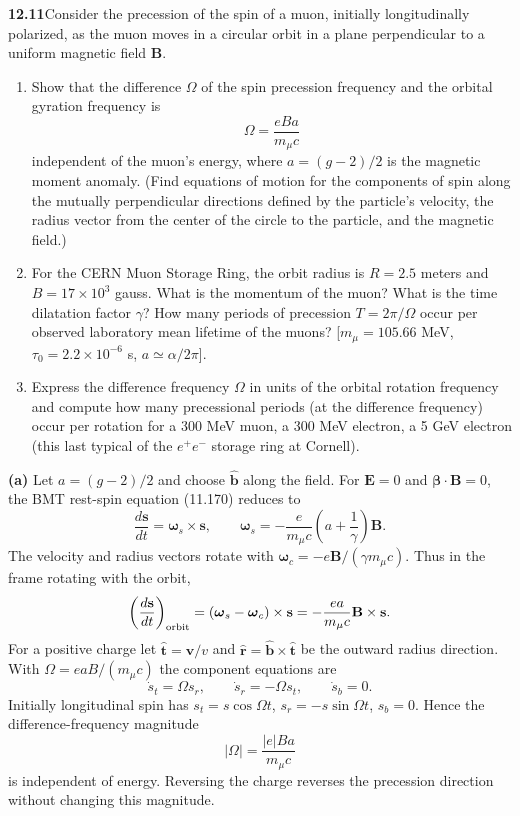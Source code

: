 \par\bigskip
\noindent\textbf{12.11}\quad Consider the precession of the spin of a muon, initially longitudinally polarized, as the muon moves in a circular orbit in a plane perpendicular to a uniform magnetic field $\mathbf{B}$.
\begin{enumerate}
\item[(a)] Show that the difference $\Omega$ of the spin precession frequency and the orbital gyration frequency is
\[
\Omega=\frac{eBa}{m_{\mu}c}
\]
independent of the muon's energy, where $a=(g-2)/2$ is the magnetic moment anomaly. (Find equations of motion for the components of spin along the mutually perpendicular directions defined by the particle's velocity, the radius vector from the center of the circle to the particle, and the magnetic field.)
\item[(b)] For the CERN Muon Storage Ring, the orbit radius is $R=2.5$ meters and $B=17\times10^{3}$ gauss. What is the momentum of the muon? What is the time dilatation factor $\gamma$? How many periods of precession $T=2\pi/\Omega$ occur per observed laboratory mean lifetime of the muons? [$m_{\mu}=105.66$ MeV, $\tau_{0}=2.2\times10^{-6}$ s, $a\simeq\alpha/2\pi$].
\item[(c)] Express the difference frequency $\Omega$ in units of the orbital rotation frequency and compute how many precessional periods (at the difference frequency) occur per rotation for a 300 MeV muon, a 300 MeV electron, a 5 GeV electron (this last typical of the $e^{+}e^{-}$ storage ring at Cornell).
\end{enumerate}
\solution

\medskip\noindent\textbf{(a)} Let $a=(g-2)/2$ and choose $\widehat{\mathbf b}$ along the field.
For $\mathbf E=0$ and $\boldsymbol\beta\cdot\mathbf B=0$, the BMT
rest-spin equation (11.170) reduces to
\[
\frac{d\mathbf s}{dt}=\boldsymbol\omega_s\times\mathbf s,
\qquad
\boldsymbol\omega_s=-\frac e{m_\mu c}
 \left(a+\frac1\gamma\right)\mathbf B.
\]
The velocity and radius vectors rotate with
$\boldsymbol\omega_c=-e\mathbf B/(\gamma m_\mu c)$.
Thus in the frame rotating with the orbit,
\[
\left(\frac{d\mathbf s}{dt}\right)_{\rm orbit}
=(\boldsymbol\omega_s-\boldsymbol\omega_c)\times\mathbf s
=-\frac{ea}{m_\mu c}\mathbf B\times\mathbf s.
\]
For a positive charge let $\widehat{\mathbf t}=\mathbf v/v$ and
$\widehat{\mathbf r}=\widehat{\mathbf b}\times\widehat{\mathbf t}$
be the outward radius direction.  With
$\Omega=eaB/(m_\mu c)$ the component equations are
\[
\dot s_t=\Omega s_r,\qquad
\dot s_r=-\Omega s_t,\qquad \dot s_b=0.
\]
Initially longitudinal spin has
$s_t=s\cos\Omega t$, $s_r=-s\sin\Omega t$, $s_b=0$.
Hence the difference-frequency magnitude
\[
\boxed{|\Omega|=\frac{|e|Ba}{m_\mu c}}
\]
is independent of energy.  Reversing the charge reverses the
precession direction without changing this magnitude.

